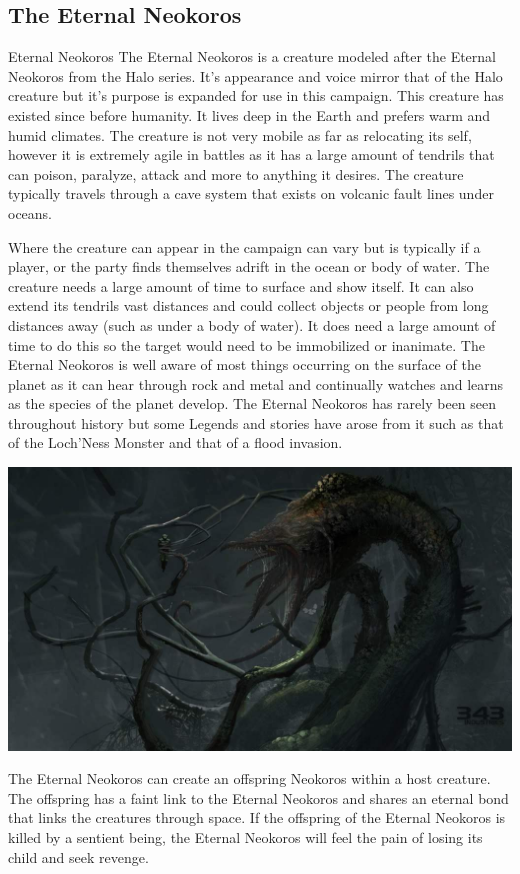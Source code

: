 \subsection{The Eternal Neokoros}

\begin{commentbox}{Eternal Neokoros}	
	The Eternal Neokoros is a creature modeled after the Eternal Neokoros from the Halo series. It's appearance and voice mirror that of the Halo creature but it's purpose is expanded for use in this campaign. This creature has existed since before humanity. It lives deep in the Earth and prefers warm and humid climates. The creature is not very mobile as far as relocating its self, however it is extremely agile in battles as it has a large amount of tendrils that can poison, paralyze, attack and more to anything it desires. The creature typically travels through a cave system that exists on volcanic fault lines under oceans. 
	
	Where the creature can appear in the campaign can vary but is typically if a player, or the party finds themselves adrift in the ocean or body of water. The creature needs a large amount of time to surface and show itself. It can also extend its tendrils vast distances and could collect objects or people from long distances away (such as under a body of water). It does need a large amount of time to do this so the target would need to be immobilized or inanimate. The Eternal Neokoros is well aware of most things occurring on the surface of the planet as it can hear through rock and metal and continually watches and learns as the species of the planet develop. The Eternal Neokoros has rarely been seen throughout history but some Legends and stories have arose from it such as that of the Loch'Ness Monster and that of a flood invasion.
	
	\begin{center}
		\includegraphics[width=0.95\linewidth]{img/Halo/gravemind.jpg}
	\end{center}

	The Eternal Neokoros can create an offspring Neokoros within a host creature. The offspring has a faint link to the Eternal Neokoros and shares an eternal bond that links the creatures through space. If the offspring of the Eternal Neokoros is killed by a sentient being, the Eternal Neokoros will feel the pain of losing its child and seek revenge.
\end{commentbox}

